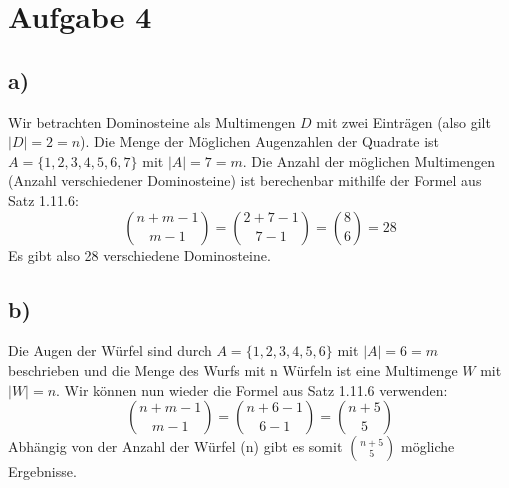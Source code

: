 \section*{Aufgabe 4}
\subsection*{a)}
Wir betrachten Dominosteine als Multimengen $D$ mit zwei Einträgen (also gilt $|D| = 2 = n$). Die Menge der Möglichen Augenzahlen der Quadrate ist $A = \{1,2,3,4,5,6,7\}$ mit $|A|=7=m$. Die Anzahl der möglichen Multimengen (Anzahl verschiedener Dominosteine) ist berechenbar mithilfe der Formel aus Satz 1.11.6:
\[
  \binom{n+m-1}{m-1} = \binom{2+7-1}{7-1} = \binom{8}{6} = 28
\]
Es gibt also 28 verschiedene Dominosteine.
\subsection*{b)}
Die Augen der Würfel sind durch $A = \{1,2,3,4,5,6\}$ mit $|A|=6=m$ beschrieben und die Menge des Wurfs mit n Würfeln ist eine Multimenge $W$ mit $|W|=n$. Wir können nun wieder die Formel aus Satz 1.11.6 verwenden:
\[
  \binom{n+m-1}{m-1} = \binom{n+6-1}{6-1} = \binom{n+5}{5}
\]
Abhängig von der Anzahl der Würfel (n) gibt es somit $\binom{n+5}{5}$ mögliche Ergebnisse.